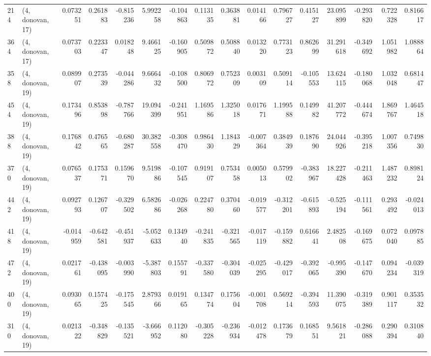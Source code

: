 \begin{tabular}{llrrrrrrrrrrrrrr}
214 &  (4, donovan, 17) &   0.073251 &  0.261883 & -0.815236 &    5.992258 & -0.104863 &   0.113135 &  0.363881 &  0.014166 &  0.796727 &  0.415127 &    23.095899 & -0.293820 &  0.722328 &  0.816617 \\
364 &  (4, donovan, 17) &   0.073703 &  0.223347 &  0.018248 &    9.466125 & -0.160905 &   0.509872 &  0.508840 &  0.013220 &  0.773123 &  0.862699 &    31.291618 & -0.349692 &  1.051982 &  1.088864 \\
358 &  (4, donovan, 19) &   0.089907 &  0.273539 & -0.044286 &    9.666432 & -0.108500 &   0.806972 &  0.752309 &  0.003109 &  0.509114 & -0.105553 &    13.624115 & -0.180068 &  1.032048 &  0.681447 \\
454 &  (4, donovan, 19) &   0.173496 &  0.853898 & -0.787766 &   19.094399 & -0.241951 &   1.169586 &  1.325018 &  0.017671 &  1.199588 &  0.149982 &    41.207772 & -0.444674 &  1.869767 &  1.464518 \\
388 &  (4, donovan, 19) &   0.176842 &  0.476565 & -0.680287 &   30.382558 & -0.308470 &   0.986430 &  1.184329 & -0.007364 &  0.384939 &  0.187690 &    24.044926 & -0.395218 &  1.007356 &  0.749830 \\
370 &  (4, donovan, 19) &   0.076537 &  0.175371 &  0.159670 &    9.519886 & -0.107545 &   0.919107 &  0.753458 &  0.005013 &  0.579902 & -0.383967 &    18.227428 & -0.211463 &  1.487232 &  0.898124 \\
442 &  (4, donovan, 19) &   0.092793 &  0.126707 & -0.329502 &    6.582686 & -0.026268 &   0.224780 &  0.370460 & -0.019577 & -0.312201 & -0.615893 &    -0.525194 & -0.111561 &  0.293492 & -0.024013 \\
418 &  (4, donovan, 19) &  -0.014959 & -0.642581 & -0.451937 &   -5.052633 &  0.134940 &  -0.241835 & -0.321565 & -0.017119 & -0.159882 &  0.616641 &     2.482508 & -0.169675 &  0.072040 &  0.097885 \\
472 &  (4, donovan, 19) &   0.021761 & -0.438095 & -0.003990 &   -5.387803 &  0.155791 &  -0.337580 & -0.304039 & -0.025295 & -0.429017 & -0.392065 &    -0.995390 & -0.147670 &  0.094234 & -0.039319 \\
400 &  (4, donovan, 19) &   0.093065 &  0.157425 & -0.175545 &    2.879366 &  0.019165 &   0.134774 &  0.175604 & -0.001708 &  0.569214 & -0.394593 &    11.390075 & -0.319389 &  0.901117 &  0.353532 \\
310 &  (4, donovan, 19) &   0.021322 & -0.348829 & -0.135521 &   -3.666952 &  0.112080 &  -0.305228 & -0.236934 & -0.012478 &  0.173679 &  0.168551 &     9.561821 & -0.286088 &  0.290394 &  0.310840 \\

\end{tabular}
